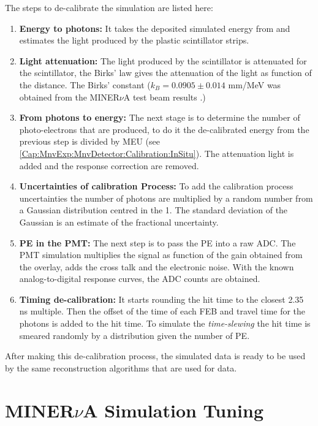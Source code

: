 The steps to de-calibrate the simulation are listed here: 
\begin{enumerate}
    \item \textbf{Energy to photons:} It takes the deposited simulated energy from and estimates the light produced by the plastic scintillator strips.  
    \item \textbf{Light attenuation:} The light produced by the scintillator is attenuated for the scintillator, the Birks' law \cite{PhysRevD.98.030001} gives the attenuation of the light as function of the distance. The Birks' constant ($k_B =  0.0905 \pm 0.014 $ mm/MeV was obtained from the MINER$\nu$A test beam results \cite{minervacollaboration2015minerva}.)
    \item \textbf{From photons to energy:} The next stage is to determine the number of photo-electrons that are produced, to do it the de-calibrated energy from the previous step is divided by MEU (see \ref{Cap:MnvExp:MnvDetector:Calibration:InSitu}). The attenuation light is added and the response correction are removed. 
    \item \textbf{Uncertainties of calibration Process:} To add the calibration process uncertainties the number of photons are multiplied by a random number from a Gaussian distribution centred in the 1. The standard deviation of the Gaussian is an estimate of the fractional uncertainty. 
    \item \textbf{PE in the PMT:} The next step is to pass the PE into a raw ADC. The PMT simulation multiplies the signal as function of the gain obtained from the overlay, adds the cross talk and the electronic noise. With the known analog-to-digital response curves, the ADC counts are obtained. 
    \item \textbf{Timing de-calibration:} It starts rounding the hit time to the closest 2.35 ns multiple. Then the offset of the time of each FEB and travel time for the photons is added to the hit time. To simulate the \textit{time-slewing} the hit time is smeared randomly by a distribution given the number of PE. 
\end{enumerate}

After making this de-calibration process, the simulated data is ready to be used by the same reconstruction algorithms that are used for data. 


\section{MINER$\nu$A Simulation Tuning}
\label{Cap:Simulation:MnvGENIETunes}

